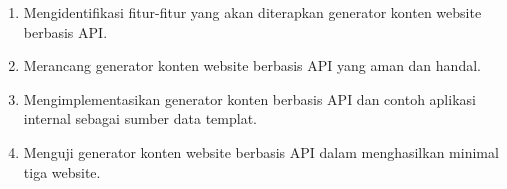 \begin{enumerate}
    
    \item Mengidentifikasi fitur-fitur yang akan diterapkan generator konten website berbasis API.
 
    \item Merancang generator konten website berbasis API yang aman dan handal.

    \item Mengimplementasikan generator konten berbasis API dan contoh aplikasi internal sebagai sumber data templat.

    \item Menguji generator konten website berbasis API dalam menghasilkan minimal tiga website.
    
\end{enumerate}